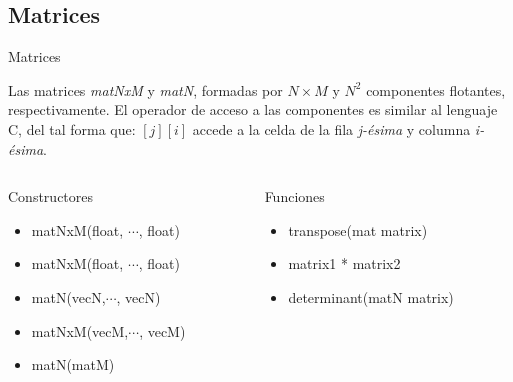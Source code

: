 \subsection{Matrices}
\begin{frame}{Matrices}
    
    Las matrices \textit{matNxM} y \textit{matN}, formadas por \(N\times M\) y \(N^2\) componentes flotantes, respectivamente. El operador de acceso a las componentes es similar al lenguaje C, del tal forma que: \([j][i]\) accede a la celda de la fila \textit{j-ésima} y columna \textit{i-ésima}.
    \vfill
    
    \begin{columns}[onlytextwidth]
        \begin{column}{0.45\textwidth}
            {\Large Constructores}
            \begin{itemize}
                \item matNxM(float, \(\cdots\), float)
                \item matNxM(float, \(\cdots\), float)
                \item matN(vecN,\(\cdots\), vecN)
                \item matNxM(vecM,\(\cdots\), vecM)
                \item matN(matM)
            \end{itemize}
        \end{column}
        
        \begin{column}{0.45\textwidth}
            {\Large Funciones}
            \begin{itemize}
                \item transpose(mat matrix)
                \item matrix1 * matrix2
                \item determinant(matN matrix)
            \end{itemize}
        \end{column}
        
    \end{columns}

\end{frame}

